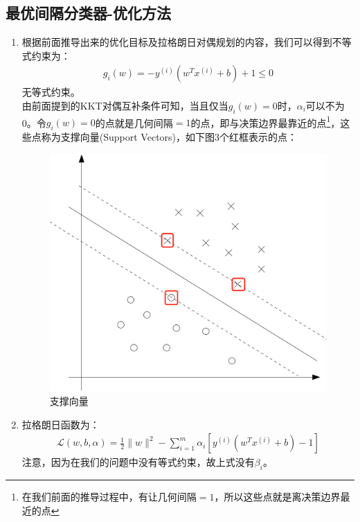 \subsection{最优间隔分类器-优化方法}
\begin{enumerate}
	\item 根据前面推导出来的优化目标及拉格朗日对偶规划的内容，我们可以得到不等式约束为：
	\begin{align}
		g_i(w) = -y^{(i)}\left(w^Tx^{(i)}+b\right)+1 \leq 0
	\end{align}
	无等式约束。\\
	由前面提到的KKT对偶互补条件可知，当且仅当$g_i(w)=0$时，$\alpha_i$可以不为0。令$g_i(w)=0$的点就是几何间隔$=1$的点，即与决策边界最靠近的点\footnote{在我们前面的推导过程中，有让几何间隔$=1$，所以这些点就是离决策边界最近的点}，这些点称为支撑向量(Support Vectors)，如下图3个红框表示的点：
	\begin{figure}[htbp]
		\centering
		\includegraphics[scale=0.35]{images/支撑向量}
		\caption{支撑向量}
	\end{figure}

	\item 拉格朗日函数为：
	\begin{align}
		\mathcal{L}(w, b, \alpha) = \frac{1}{2}\|w\|^2 - \sum_{i=1}^{m}\alpha_i \left[y^{(i)}(w^Tx^{(i)}+b)-1\right]
	\end{align}
	注意，因为在我们的问题中没有等式约束，故上式没有$\beta_i$。


\end{enumerate}
